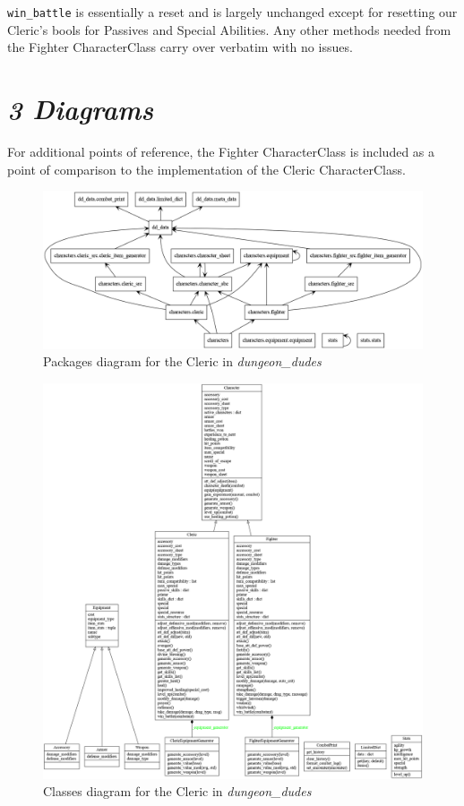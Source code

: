 \documentclass[11pt]{extbook}
\newcommand\tab[1][1cm]{\hspace*{#1}}
\begin{document}
\tab \verb|win_battle| is essentially a reset and is largely unchanged except 
for resetting our Cleric's bools for Passives and Special Abilities. Any other
methods needed from the Fighter CharacterClass carry over verbatim with no 
issues.

\section*{\emph{3 Diagrams}}

\tab For additional points of reference, the Fighter CharacterClass is included as
a point of comparison to the implementation of the Cleric CharacterClass.

\begin{figure}[H]
    \centering
    \includegraphics[scale=0.35]{01_packages_cleric}
    \caption{Packages diagram for the Cleric in \emph{dungeon\_dudes}}
\end{figure}

\newpage
\begin{landscape}

\begin{figure}[H]
    \centering
    \includegraphics[scale=0.24]{02_classes_cleric}
    \caption{Classes diagram for the Cleric in \emph{dungeon\_dudes}}
\end{figure}

\end{landscape}
\end{document}
